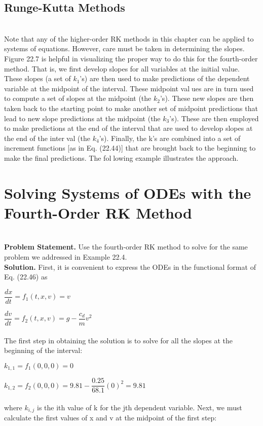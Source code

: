 \section{Runge-Kutta Methods}
\\
Note that any of the higher-order RK methods in this chapter can be applied to systems of
equations. However, care must be taken in determining the slopes. Figure 22.7 is helpful in
visualizing the proper way to do this for the fourth-order method. That is, we first develop
slopes for all variables at the initial value. These slopes (a set of $k_1$'s) are then used to make
predictions of the dependent variable at the midpoint of the interval. These midpoint values are in turn used to compute a set of slopes at the midpoint (the $k_2$'s). These new slopes
are then taken back to the starting point to make another set of midpoint predictions that
lead to new slope predictions at the midpoint (the $k_3$'s). These are then employed to make
predictions at the end of the interval that are used to develop slopes at the end of the interval (the $k_4$’s). Finally, the k’s are combined into a set of increment functions [as in
Eq. (22.44)] that are brought back to the beginning to make the final predictions. The following example illustrates the approach.

\vspace{0,3in}
\chapter{Solving Systems of ODEs with the Fourth-Order RK Method}
\vspace{0,1in}
\hline\\
\vspace{0,1in}
\textbf{Problem Statement.} Use the fourth-order RK method to solve for the same problem we
addressed in Example 22.4.
\vspace{0.2in}\\
\textbf{Solution.} First, it is convenient to express the ODEs in the functional format of
Eq. (22.46) as

$\dfrac{dx}{dt} = f_1(t,x,v) = v$

$\dfrac{dv}{dt} = f_2(t,x,v) = g - \dfrac{c_d}{m} v^2$\\
\\
The first step in obtaining the solution is to solve for all the slopes at the beginning of the
interval:

$k_{1,1} = f_1(0,0,0) = 0$

$k_{1,2} = f_2(0,0,0) = 9.81 - \dfrac{0.25}{68.1}(0)^2 = 9.81$\\
\\
where $k_{i,j}$ is the ith value of k for the jth dependent variable. Next, we must calculate the
first values of x and v at the midpoint of the first step:

